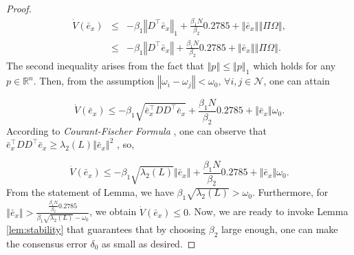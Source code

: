\documentclass[letterpaper, 10 pt, conference]{ieeeconf}  %
\begin{document}
{\begin{proof}
	\begin{eqnarray*}
	\dot{V}(\bar{e}_{x}) & \leq & -\beta_{1}\left\Vert D^{\top}\bar{e}_{x}\right\Vert _{1}+{\scriptstyle \frac{\beta_{1}N}{\beta_{2}}}0.2785+\left\Vert \bar{e}_{x}\right\Vert \left\Vert \Pi\Omega\right\Vert ,\\
	& \leq & -\beta_{1}\left\Vert D^{\top}\bar{e}_{x}\right\Vert +{\scriptstyle \frac{\beta_{1}N}{\beta_{2}}}0.2785+\left\Vert \bar{e}_{x}\right\Vert \left\Vert \Pi\Omega\right\Vert .
	\end{eqnarray*}
	The second inequality arises from the fact that $\left\Vert p\right\Vert \leq\left\Vert p\right\Vert _{1}$
which  holds for any $p\in\mathbb{R}^{n}$. Then, from the assumption
	$\left\Vert \omega_{i}-\omega_{j}\right\Vert <\omega_{0},\,\forall i,j \in \mathcal N $,
	one can attain
	
	\begin{equation}
	\dot{V}(\bar{e}_{x})\leq-\beta_{1}\sqrt{\bar{e}_{x}^{\top}DD^{\top}\bar{e}_{x}}+{\scriptstyle \frac{\beta_{1}N}{\beta_{2}}}0.2785+\left\Vert \bar{e}_{x}\right\Vert \omega_{0}.
	\end{equation}
	According to \textit{Courant-Fischer Formula} \cite{horn2012matrix},
	one can observe that $\bar{e}_{x}^{\top}DD^{\top}\bar{e}_{x}\geq\lambda_{2}(L)\left\Vert \bar{e}_{x}\right\Vert ^{2}$
	, so,
	
	\[
	\dot{V}(\bar{e}_{x})\leq-\beta_{1}\sqrt{\lambda_{2}(L)}\left\Vert \bar{e}_{x}\right\Vert +{\scriptstyle \frac{\beta_{1}N}{\beta_{2}}}0.2785+\left\Vert \bar{e}_{x}\right\Vert \omega_{0}.
	\]
	From the statement of Lemma, we have $\beta_{1}\sqrt{\lambda_{2}(L)}>\omega_{0}$.
	Furthermore, for $\left\Vert \bar{e}_{x}\right\Vert >\frac{\frac{\beta_{1}N}{\beta_{2}}0.2785}{\beta_{1}\sqrt{\lambda_{2}(L)}-\omega_{0}}$,
	we obtain $\dot{V}(\bar{e}_{x})\leq0$. Now, we are ready to invoke
	Lemma \ref{lem:stability} that guarantees that by choosing $\beta_{2}$
	large enough, one can make the consensus error $\delta_{0}$ as small
	as desired.
	
\end{proof}

}
\end{document}
